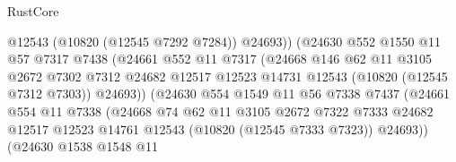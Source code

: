 \begin{lexlean}{RustCore}
\begin{coremodule}
                                    @12543
                                    (@10820 (@12545 @7292 @7284))
                                    @24693))
                                (@24630
                                  @552
                                  @1550
                                  @11
                                  @57
                                  @7317
                                  @7438
                                  (@24661
                                    @552
                                    @11
                                    @7317
                                    (@24668
                                      @146
                                      @62
                                      @11
                                      @3105
                                      @2672
                                      @7302
                                      @7312
                                      @24682
                                      @12517
                                      @12523
                                      @14731
                                      @12543
                                      (@10820 (@12545 @7312 @7303))
                                      @24693))
                                  (@24630
                                    @554
                                    @1549
                                    @11
                                    @56
                                    @7338
                                    @7437
                                    (@24661
                                      @554
                                      @11
                                      @7338
                                      (@24668
                                        @74
                                        @62
                                        @11
                                        @3105
                                        @2672
                                        @7322
                                        @7333
                                        @24682
                                        @12517
                                        @12523
                                        @14761
                                        @12543
                                        (@10820 (@12545 @7333 @7323))
                                        @24693))
                                    (@24630
                                      @1538
                                      @1548
                                      @11

\end{coremodule}
\end{lexlean}
